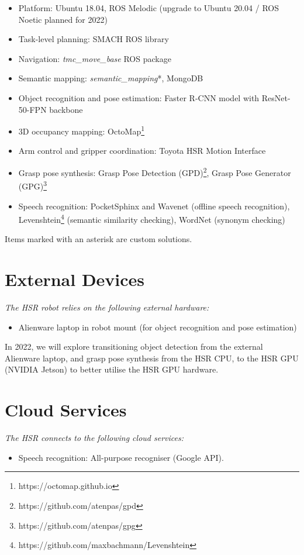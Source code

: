 \begin{itemize}
	\item Platform: Ubuntu 18.04, ROS Melodic (upgrade to Ubuntu 20.04 / ROS Noetic planned for 2022)
	\item Task-level planning: SMACH ROS library
	\item Navigation: \textit{tmc\_move\_base} ROS package
	\item Semantic mapping: \emph{semantic\_mapping}*, \mbox{MongoDB}
	\item Object recognition and pose estimation: Faster R-CNN model with ResNet-50-FPN backbone
	\item 3D occupancy mapping: OctoMap\footnote{https://octomap.github.io}
	\item Arm control and gripper coordination: Toyota HSR Motion Interface
	\item Grasp pose synthesis: Grasp Pose Detection  (GPD)\footnote{https://github.com/atenpas/gpd}, Grasp Pose Generator (GPG)\footnote{https://github.com/atenpas/gpg}
	\item Speech recognition: PocketSphinx and Wavenet (offline speech recognition), Levenshtein\footnote{https://github.com/maxbachmann/Levenshtein} (semantic similarity checking), WordNet (synonym checking) 
\end{itemize}

\noindent Items marked with an asterisk are \teamori{} custom solutions.

\section*{External Devices}

\textit{The HSR robot relies on the following external hardware:}

\begin{itemize}
	\item Alienware laptop in robot mount (for object recognition and pose estimation)
\end{itemize}

In 2022, we will explore transitioning object detection from the external Alienware laptop, and grasp pose synthesis from the HSR CPU, to the HSR GPU (NVIDIA Jetson) to better utilise the HSR GPU hardware.

\section*{Cloud Services}

\textit{The HSR connects to the following cloud services:}
\begin{itemize}
	\item Speech recognition: All-purpose recogniser (Google API).
\end{itemize}